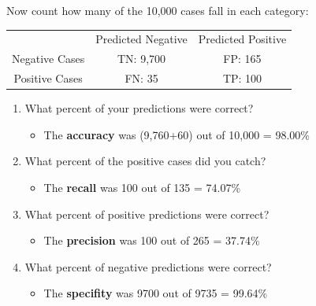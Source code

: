 \documentclass[]{report}
\begin{document}
Now count how many of the 10,000 cases fall in each category:
\begin{center}
\begin{tabular}{|c|c|c|}
  \hline
&Predicted Negative & Predicted Positive\\
Negative Cases & TN: 9,700 & FP: 165 \\
Positive Cases & FN: 35 & TP: 100 \\

  \hline
\end{tabular}
\end{center}
\begin{enumerate}
	\item What percent of your predictions were correct?
	
	\begin{itemize}
		\item The \textbf{accuracy} was (9,760+60) out of 10,000 = 98.00\%
	\end{itemize}
	
	\item 	What percent of the positive cases did you catch?
	
	\begin{itemize}
		\item The \textbf{recall} was 100 out of 135 = 74.07\%
	\end{itemize}
	
	\item 	What percent of positive predictions were correct?
	
	\begin{itemize}
		\item The \textbf{precision} was 100 out of 265 = 37.74\%
	\end{itemize}
	
	\item 	What percent of negative predictions were correct?
	
	\begin{itemize}
		\item The \textbf{specifity} was 9700 out of 9735 = 99.64\%
	\end{itemize}
\end{enumerate}
\end{document}
